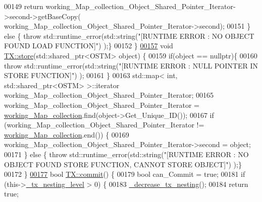 \begin{DoxyCode}
00149         \textcolor{keywordflow}{return} working\_Map\_collection\_Object\_Shared\_Pointer\_Iterator->second->getBaseCopy(
      working\_Map\_collection\_Object\_Shared\_Pointer\_Iterator->second);
00151     \} \textcolor{keywordflow}{else} \{ \textcolor{keywordflow}{throw} std::runtime\_error(std::string(\textcolor{stringliteral}{"[RUNTIME ERROR : NO OBJECT FOUND LOAD FUNCTION]"}) );\}
00152 \}
\hypertarget{_t_x_8cpp_source.tex_l00157}{}\hyperlink{class_t_x_a7dbcb369aa4a3370b6c6829d278ece5d_a7dbcb369aa4a3370b6c6829d278ece5d}{00157} \textcolor{keywordtype}{void} \hyperlink{class_t_x_a7dbcb369aa4a3370b6c6829d278ece5d_a7dbcb369aa4a3370b6c6829d278ece5d}{TX::store}(std::shared\_ptr<OSTM> \textcolor{keywordtype}{object}) \{
00159     \textcolor{keywordflow}{if}(\textcolor{keywordtype}{object} == \textcolor{keyword}{nullptr})\{
00160         \textcolor{keywordflow}{throw} std::runtime\_error(std::string(\textcolor{stringliteral}{"[RUNTIME ERROR : NULL POINTER IN STORE FUNCTION]"}) );
00161     \}
00163     std::map< int, std::shared\_ptr<OSTM> >::iterator working\_Map\_collection\_Object\_Shared\_Pointer\_Iterator;
00165     working\_Map\_collection\_Object\_Shared\_Pointer\_Iterator = 
      \hyperlink{class_t_x_a81aafda16e2f20e36ec6c68e584668ff_a81aafda16e2f20e36ec6c68e584668ff}{working\_Map\_collection}.find(object->Get\_Unique\_ID());
00167     \textcolor{keywordflow}{if} (working\_Map\_collection\_Object\_Shared\_Pointer\_Iterator != 
      \hyperlink{class_t_x_a81aafda16e2f20e36ec6c68e584668ff_a81aafda16e2f20e36ec6c68e584668ff}{working\_Map\_collection}.end()) \{
00169         working\_Map\_collection\_Object\_Shared\_Pointer\_Iterator->second = object;
00171     \} \textcolor{keywordflow}{else} \{ \textcolor{keywordflow}{throw} std::runtime\_error(std::string(\textcolor{stringliteral}{"[RUNTIME ERROR : NO OBJECT FOUND STORE FUNCTION, CANNOT
       STORE OBJECT]"}) );\}
00172 \}
\hypertarget{_t_x_8cpp_source.tex_l00177}{}\hyperlink{class_t_x_a9dde5d356b35e557448e58d260087356_a9dde5d356b35e557448e58d260087356}{00177} \textcolor{keywordtype}{bool} \hyperlink{class_t_x_a9dde5d356b35e557448e58d260087356_a9dde5d356b35e557448e58d260087356}{TX::commit}() \{
00179     \textcolor{keywordtype}{bool} can\_Commit = \textcolor{keyword}{true};
00181     \textcolor{keywordflow}{if} (this->\hyperlink{class_t_x_ae8f413fd7f4fea322e7ad3c668f9898e_ae8f413fd7f4fea322e7ad3c668f9898e}{\_tx\_nesting\_level} > 0) \{
00183         \hyperlink{class_t_x_aa3ac499f576326588628ade96b27b4b1_aa3ac499f576326588628ade96b27b4b1}{\_decrease\_tx\_nesting}();
00184         \textcolor{keywordflow}{return} \textcolor{keyword}{true};

\end{DoxyCode}
